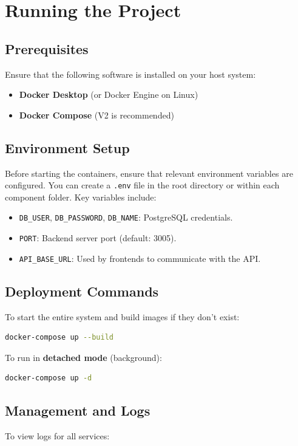 \documentclass{article}
\begin{document}
\section{Running the Project}

\subsection{Prerequisites}
Ensure that the following software is installed on your host system:
\begin{itemize}
    \item \textbf{Docker Desktop} (or Docker Engine on Linux)
    \item \textbf{Docker Compose} (V2 is recommended)
\end{itemize}

\subsection{Environment Setup}
Before starting the containers, ensure that relevant environment variables are configured. You can create a \texttt{.env} file in the root directory or within each component folder. Key variables include:
\begin{itemize}
    \item \texttt{DB\_USER}, \texttt{DB\_PASSWORD}, \texttt{DB\_NAME}: PostgreSQL credentials.
    \item \texttt{PORT}: Backend server port (default: 3005).
    \item \texttt{API\_BASE\_URL}: Used by frontends to communicate with the API.
\end{itemize}

\subsection{Deployment Commands}
To start the entire system and build images if they don't exist:

\begin{lstlisting}[language=bash]
docker-compose up --build
\end{lstlisting}

To run in \textbf{detached mode} (background):

\begin{lstlisting}[language=bash]
docker-compose up -d
\end{lstlisting}

\subsection{Management and Logs}
To view logs for all services:
\end{document}
